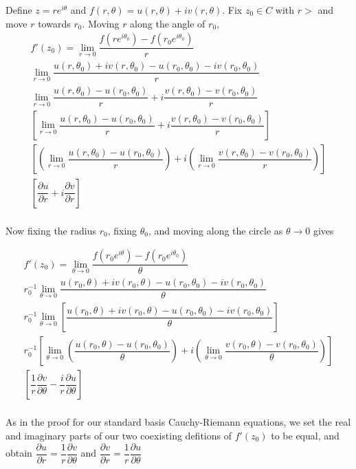 \documentclass{article}
\begin{document}
Define $z = re^{i\theta}$ and $f(r, \theta) = u(r, \theta) + iv(r, \theta)$. Fix $z_0 \in C$ with $r > $ and move $r$ towards $r_0$. Moving $r$ along the angle of $r_0$, 
\begin{align*}
    f'(z_0) = \lim\limits_{r\to 0} \dfrac{f(re^{i\theta_0}) - f(r_0e^{i\theta_0})}{r}\\
    \lim\limits_{r\to 0} \dfrac{u(r, \theta_0) + iv(r, \theta_0) - u(r_0, \theta_0) - iv(r_0, \theta_0)}{r}\\
    \lim\limits_{r\to 0} \dfrac{u(r, \theta_0)  - u(r_0, \theta_0) }{r}+ i\dfrac{v(r, \theta_0)- v(r_0, \theta_0)}{r}\\
    \left[\lim\limits_{r\to 0} \dfrac{u(r, \theta_0)  - u(r_0, \theta_0) }{r}+ i\dfrac{v(r, \theta_0)- v(r_0, \theta_0)}{r}\right]\\
    \left[\left(\lim\limits_{r\to 0} \dfrac{u(r, \theta_0)  - u(r_0, \theta_0) }{r}\right)+ i\left(\lim\limits_{r\to 0}\dfrac{v(r, \theta_0)- v(r_0, \theta_0)}{r}\right)\right]\\
    \left[\dfrac{\partial u}{\partial r} + i \dfrac{\partial v}{\partial r}\right]\\
\end{align*}

Now fixing the radius $r_0$, fixing $\theta_0$, and moving along the circle as $\theta \to 0$ gives

\begin{align*}
    f'(z_0) = \lim\limits_{\theta\to 0} \dfrac{f(r_0e^{i\theta}) - f(r_0e^{i\theta_0})}{\theta}\\
    r_0^{-1}\lim\limits_{\theta\to 0} \dfrac{u(r_0, \theta) + iv(r_0, \theta) - u(r_0, \theta_0) - iv(r_0, \theta_0)}{\theta}\\
    r_0^{-1}\lim\limits_{\theta\to 0}\left[ \dfrac{u(r_0, \theta) + iv(r_0, \theta) - u(r_0, \theta_0) - iv(r_0, \theta_0)}{\theta}\right]\\
    r_0^{-1}\left[\lim\limits_{\theta\to 0}\left(\dfrac{u(r_0, \theta) - u(r_0, \theta_0)}{\theta}\right) + i\left(\lim\limits_{\theta\to 0}\dfrac{v(r_0, \theta)  - v(r_0, \theta_0)}{\theta}\right)\right]\\
    \left[\dfrac{1}{r}\dfrac{\partial v}{\partial \theta}-\dfrac{i}{r}\dfrac{\partial u}{\partial \theta}\right]\\
\end{align*}

As in the proof for our standard basis Cauchy-Riemann equations, we set the real and imaginary parts of our two coexisting defitions of $f'(z_0)$ to be equal, and obtain $\dfrac{\partial u}{\partial r} = \dfrac{1}{r}\dfrac{\partial v}{\partial \theta}$ and $\dfrac{\partial v}{\partial r} = \dfrac{1}{r}\dfrac{\partial u}{\partial \theta}$
\end{document}
